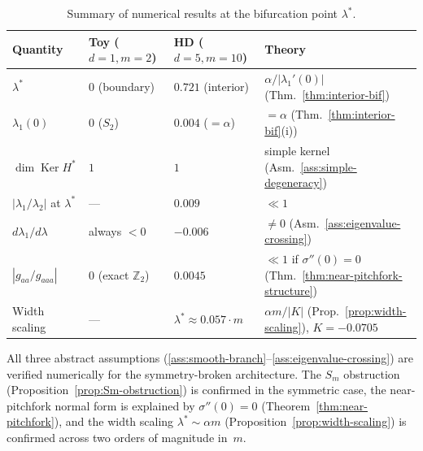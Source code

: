 \documentclass[11pt, reqno]{amsart}
\theoremstyle{plain}
\theoremstyle{definition}
\theoremstyle{remark}
\DeclareMathOperator{\Ker}{Ker}
\begin{document}
\begin{table}[ht]
\centering
\caption{Summary of numerical results at the bifurcation point $\lambda^*$.}
\label{tab:results}
\begin{tabular}{@{}llll@{}}
\toprule
Quantity & Toy ($d\!=\!1,m\!=\!2$) & HD ($d\!=\!5,m\!=\!10$) & Theory \\
\midrule
$\lambda^*$ & $0$ (boundary) & $0.721$ (interior) & $\alpha/|\lambda_1'(0)|$ (Thm.~\ref{thm:interior-bif}) \\
$\lambda_1(0)$ & $0$ ($S_2$) & $0.004$ ($=\alpha$) & $=\alpha$ (Thm.~\ref{thm:interior-bif}(i)) \\
$\dim\Ker H^*$ & $1$ & $1$ & simple kernel (Asm.~\ref{ass:simple-degeneracy}) \\
$|\lambda_1/\lambda_2|$ at $\lambda^*$ & --- & $0.009$ & $\ll 1$ \\
$d\lambda_1/d\lambda$ & always $<0$ & $-0.006$ & $\neq 0$ (Asm.~\ref{ass:eigenvalue-crossing}) \\
$|g_{aa}/g_{aaa}|$ & $0$ (exact $\mathbb Z_2$) & $0.0045$ & $\ll 1$ if $\sigma''(0)=0$ (Thm.~\ref{thm:near-pitchfork-structure}) \\
Width scaling & --- & $\lambda^*\approx 0.057\cdot m$ & $\alpha m/|K|$ (Prop.~\ref{prop:width-scaling}), $K=-0.0705$ \\
\bottomrule
\end{tabular}
\end{table}

All three abstract assumptions (\ref{ass:smooth-branch}--\ref{ass:eigenvalue-crossing}) are verified numerically for the symmetry-broken architecture. The $S_m$ obstruction (Proposition~\ref{prop:Sm-obstruction}) is confirmed in the symmetric case, the near-pitchfork normal form is explained by $\sigma''(0)=0$ (Theorem~\ref{thm:near-pitchfork}), and the width scaling $\lambda^*\sim\alpha m$ (Proposition~\ref{prop:width-scaling}) is confirmed across two orders of magnitude in~$m$.
\end{document}
